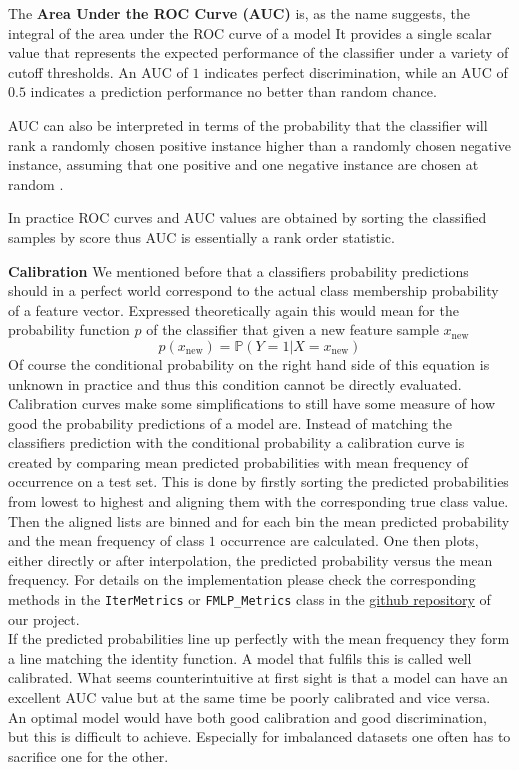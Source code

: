 The \textbf{Area Under the ROC Curve (AUC)} is, as the name suggests, the integral of the area under the ROC curve of a model
It provides a single scalar value that represents the expected performance of the classifier under a variety of cutoff thresholds.
An AUC of $1$ indicates perfect discrimination, while an AUC of $0.5$ indicates a prediction performance no better than random chance.

AUC can also be interpreted in terms of the probability that the classifier will rank a randomly chosen positive instance higher than a randomly chosen negative instance,
assuming that one positive and one negative instance are chosen at random \cite{hanley1982meaning}.

In practice ROC curves and AUC values are obtained by sorting the classified samples by score thus AUC is essentially a rank order statistic.

\textbf{Calibration}
We mentioned before that a classifiers probability predictions should in a perfect world correspond to the actual class membership probability of a feature vector.
Expressed theoretically again this would mean for the probability function $p$ of the classifier that given a new feature sample $x_\text{new}$
\[
	p(x_\text{new}) = \mathbb{P}(Y = 1 | X = x_\text{new})
\]
Of course the conditional probability on the right hand side of this equation is unknown in practice and thus this condition cannot be directly evaluated.
Calibration curves make some simplifications to still have some measure of how good the probability predictions of a model are.
Instead of matching the classifiers prediction with the conditional probability a calibration curve is created by comparing mean predicted probabilities 
with mean frequency of occurrence on a test set.
This is done by firstly sorting the predicted probabilities from lowest to highest and aligning them with the corresponding true class value.
Then the aligned lists are binned and for each bin the mean predicted probability and the mean frequency of class $1$ occurrence are calculated.
One then plots, either directly or after interpolation, the predicted probability versus the mean frequency.
For details on the implementation please check the corresponding methods in the \texttt{IterMetrics} or \texttt{FMLP\_Metrics} class 
in the \href{https://github.com/gnthr-solve/TP_ML_Pipeline}{github repository} of our project.\\

If the predicted probabilities line up perfectly with the mean frequency they form a line matching the identity function.
A model that fulfils this is called well calibrated.
What seems counterintuitive at first sight is that a model can have an excellent AUC value but at the same time be poorly calibrated and vice versa.
An optimal model would have both good calibration and good discrimination, but this is difficult to achieve.
Especially for imbalanced datasets one often has to sacrifice one for the other.


